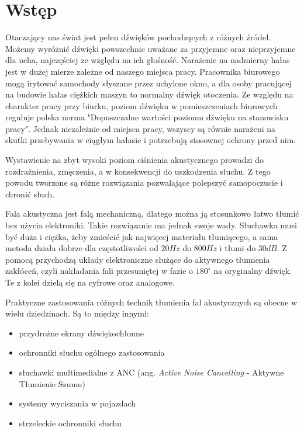 \chapter{Wstęp}
\label{cha:wstep}

Otaczający nas świat jest pełen dźwięków pochodzących z różnych źródeł. Możemy wyróżnić dźwięki powszechnie uważane za przyjemne oraz nieprzyjemne dla ucha, najczęściej ze względu na ich głośność. Narażenie na nadmierny hałas jest w dużej mierze zależne od naszego miejsca pracy. Pracownika biurowego mogą irytować samochody słyszane przez uchylone okno, a dla osoby pracującej na budowie hałas ciężkich maszyn to normalny dźwięk otoczenia. Ze względu na charakter pracy przy biurku, poziom dźwięku w pomieszczeniach biurowych reguluje polska norma "Dopuszczalne wartości poziomu dźwięku na stanowisku pracy"\cite{PolskaNormaCisnienia}. Jednak niezależnie od miejsca pracy, wszyscy są równie narażeni na skutki przebywania w ciągłym hałasie i potrzebują stosownej ochrony przed nim.

Wystawienie na zbyt wysoki poziom ciśnienia akustycznego prowadzi do rozdrażnienia, zmęczenia, a w konsekwencji do uszkodzenia słuchu. Z tego powodu tworzone są różne rozwiązania pozwalające polepszyć samopoczucie i chronić słuch. 

Fala akustyczna jest falą mechaniczną, dlatego można ją stosunkowo łatwo tłumić bez użycia elektroniki. Takie rozwiązanie ma jednak swoje wady. Słuchawka musi być duża i ciężka, żeby zmieścić jak najwięcej materiału tłumiącego, a sama metoda działa dobrze dla częstotliwości od $ 20Hz $ do $ 800Hz $ i tłumi do $ 30dB $\cite{SennheiserANC}. Z pomocą przychodzą układy elektroniczne służące do aktywnego tłumienia zakłóceń, czyli nakładania fali przesuniętej w fazie o $180^\circ$ na oryginalny dźwięk. Te z kolei dzielą się na cyfrowe oraz analogowe. 

Praktyczne zastosowania różnych technik tłumienia fal akustycznych są obecne w wielu dziedzinach. Są to między innymi:
\begin{itemize}
	\item przydrożne ekrany dźwiękochłonne
	\item ochronniki słuchu ogólnego zastosowania
	\item słuchawki multimedialne z ANC (ang. \textit{Active Noise Cancelling} - Aktywne Tłumienie Szumu)
	\item systemy wyciszania w pojazdach
	\item strzeleckie ochronniki słuchu
\end{itemize}


